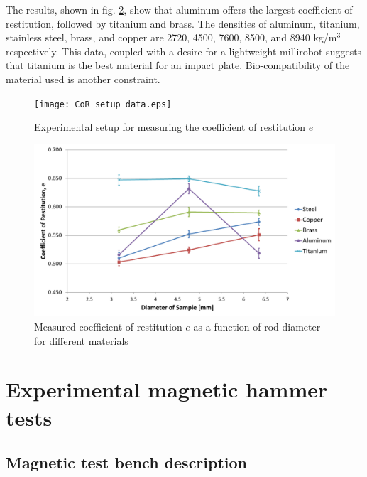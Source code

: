 \documentclass[letterpaper, 10 pt, conference]{ieeeconf}  %
\begin{document}
The results, shown in fig. \ref{CoR_Results}, show that aluminum offers the largest coefficient of restitution, followed by titanium and brass. The densities of aluminum, titanium, stainless steel, brass, and copper are 2720, 4500, 7600, 8500, and 8940 kg/m$^3$ respectively. This data, coupled with a desire for a lightweight millirobot suggests that titanium is the best material for an impact plate. Bio-compatibility of the material used is another constraint.

\begin{figure}
	\texttt{[image: CoR\_setup\_data.eps]}
	\caption{Experimental setup for measuring the coefficient of restitution $e$}
	\label{CoR_setup_data}
\end{figure}

\begin{figure}
	\includegraphics[width=\columnwidth]{CoRdata.pdf}
	\caption[Comparison of measured coefficients of restitution for different materials]{Measured coefficient of restitution $e$ as a function of rod diameter for different materials}
	\label{CoR_Results}
\end{figure}





\section{Experimental magnetic hammer tests}
\label{experiment}
\subsection{Magnetic test bench description}
\end{document}
